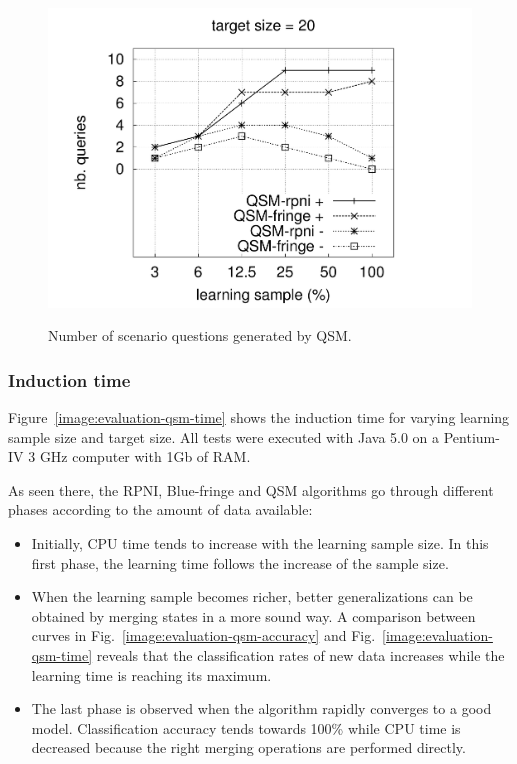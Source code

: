 \begin{figure}
{  \includegraphics[trim=30mm 0mm 35mm 0mm, clip, page=4]{src/5-evaluation/images/queries}
}
\caption{Number of scenario questions generated by QSM\label{image:evaluation-qsm-number-of-questions}.}
\end{figure}

\subsubsection*{Induction time\label{cpu:time}}

Figure~\ref{image:evaluation-qsm-time} shows the induction time for varying learning sample size and target size. All tests were executed with Java 5.0 on a Pentium-IV 3 GHz computer with 1Gb of RAM. 

As seen there, the RPNI, Blue-fringe and QSM algorithms go through different phases according to the amount of data available:
\begin{itemize} 
\item Initially, CPU time tends to increase with the learning sample size. In this first phase, the learning time follows the increase of the sample size. 
\item When the learning sample becomes richer, better generalizations can be obtained by merging states in a more sound way. A comparison between curves in Fig.~\ref{image:evaluation-qsm-accuracy} and Fig.~\ref{image:evaluation-qsm-time} reveals that the classification rates of new data increases while the learning time is reaching its maximum. 
\item The last phase is observed when the algorithm rapidly converges to a good model. Classification accuracy tends towards 100\% while CPU time is decreased because the right merging operations are performed directly. 
\end{itemize}

